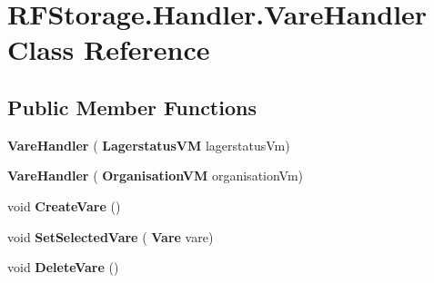 \section{R\+F\+Storage.\+Handler.\+Vare\+Handler Class Reference}
\label{class_r_f_storage_1_1_handler_1_1_vare_handler}
\subsection*{Public Member Functions}
\begin{DoxyCompactItemize}
\item 
\mbox{\label{class_r_f_storage_1_1_handler_1_1_vare_handler_a9ffa5a681ba6a270452d91d8d0acfee1}} 
{\bfseries Vare\+Handler} (\textbf{ Lagerstatus\+VM} lagerstatus\+Vm)
\item 
\mbox{\label{class_r_f_storage_1_1_handler_1_1_vare_handler_a9771ae225a8e2a40e2e72169e58c3e84}} 
{\bfseries Vare\+Handler} (\textbf{ Organisation\+VM} organisation\+Vm)
\item 
\mbox{\label{class_r_f_storage_1_1_handler_1_1_vare_handler_a21dda579ed77aa54fb1ebaa689f25579}} 
void {\bfseries Create\+Vare} ()
\item 
\mbox{\label{class_r_f_storage_1_1_handler_1_1_vare_handler_aa264bec39660eb8b39c16cbe6c75204b}} 
void {\bfseries Set\+Selected\+Vare} (\textbf{ Vare} vare)
\item 
\mbox{\label{class_r_f_storage_1_1_handler_1_1_vare_handler_ac3d85459ee3641b359ecda15302f7264}} 
void {\bfseries Delete\+Vare} ()
\end{DoxyCompactItemize}
